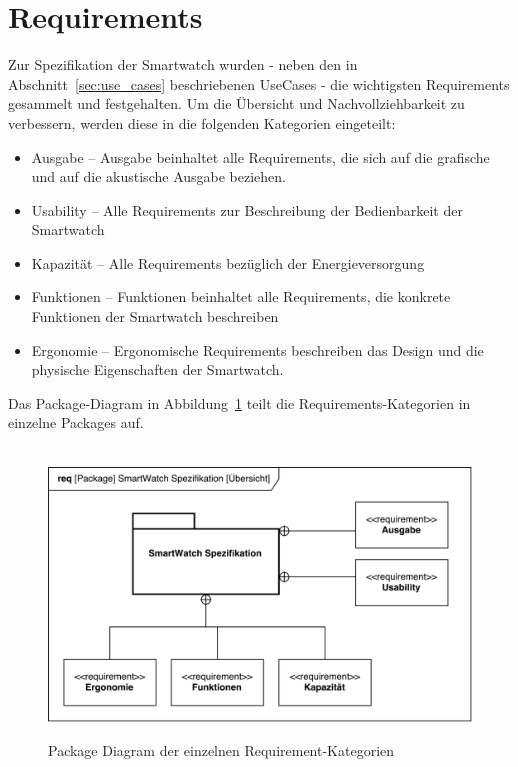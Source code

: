 \section{Requirements}
\label{sec:requirements}
Zur \gls{Spezifikation} der Smartwatch wurden - neben den in Abschnitt~\ref{sec:use_cases} beschriebenen UseCases - die wichtigsten \glspl{Requirement} gesammelt und festgehalten. Um die Übersicht und Nachvollziehbarkeit zu verbessern, werden diese in die folgenden Kategorien eingeteilt:

\begin{itemize}
	\item Ausgabe -- Ausgabe beinhaltet alle Requirements, die sich auf die grafische und auf die akustische Ausgabe beziehen.
	\item \gls{Usability} -- Alle Requirements zur Beschreibung der Bedienbarkeit der Smartwatch
	\item Kapazität -- Alle Requirements bezüglich der Energieversorgung
	\item Funktionen -- Funktionen beinhaltet alle \glspl{Requirement}, die konkrete Funktionen der Smartwatch beschreiben
	\item \gls{Ergonomie} -- Ergonomische \glspl{Requirement} beschreiben das Design und die physische Eigenschaften der Smartwatch.
\end{itemize}

Das Package-Diagram in Abbildung~\ref{fig:package_diagram_requirements} teilt die \glspl{Requirement}-Kategorien in einzelne \glspl{Package} auf.

\begin{figure}[H]
\centering\
\includegraphics[width=14cm]{img/package_diagram_smartWatch_requirements}
\caption[Requirements: Package Diagram]{Package Diagram der einzelnen Requirement-Kategorien}
\label{fig:package_diagram_requirements}
\end{figure}

